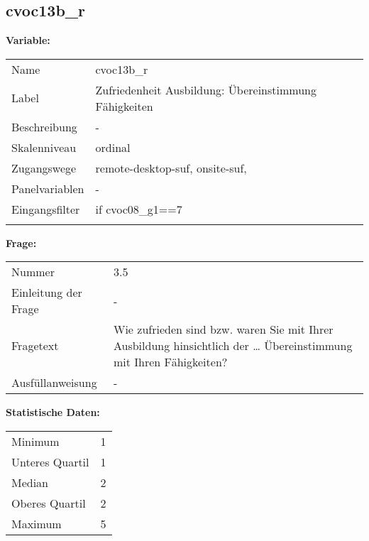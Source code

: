 	
	
	\subsection{cvoc13b\_r}
	\label{subSection:cvoc13b_r}

	\noindent\textbf{Variable:}\\
		\begin{tabular}{lL{11.3cm}}
			\label{tableVariable:cvoc13b_r}
			Name & cvoc13b\_r \\
			Label & Zufriedenheit Ausbildung: Übereinstimmung Fähigkeiten \\
			Beschreibung & - \\
			Skalenniveau & ordinal \\
			Zugangswege &
				remote-desktop-suf,
				onsite-suf,
 \\
			Panelvariablen & -
			 \\
			Eingangsfilter & if cvoc08\_g1==7 \\
 \\
		\end{tabular}

		\vspace*{1 cm}
		\noindent\textbf{Frage:}\\
		\begin{tabular}{lL{11.3cm}}
			\label{tableQuestion:cvoc13b_r}
			Nummer & 3.5 \\
			Einleitung der Frage & - \\
			Fragetext & Wie zufrieden sind bzw. waren Sie mit Ihrer Ausbildung hinsichtlich der …
Übereinstimmung mit Ihren Fähigkeiten? \\
			Ausfüllanweisung & - \\
		\end{tabular}


		\vspace*{1 cm}
		\noindent\textbf{Statistische Daten:}\\
			\begin{tabular}{ll}
				\label{tableStatistics:cvoc13b_r}
					Minimum & 1 \\
					Unteres Quartil & 1 \\
					Median & 2 \\
					Oberes Quartil & 2 \\
					Maximum & 5 \\
			\end{tabular}



